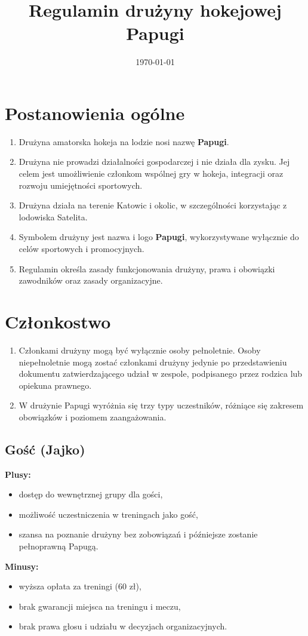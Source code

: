 \documentclass[12pt,a4paper]{article}
\title{Regulamin drużyny hokejowej Papugi}
\date{\today}
\let\stdsection\section
\renewcommand\section{\clearpage\stdsection}
\begin{document}
\maketitle
\tableofcontents

\section{Postanowienia ogólne}
\begin{enumerate}
  \item Drużyna amatorska hokeja na lodzie nosi nazwę \textbf{Papugi}.
  \item Drużyna nie prowadzi działalności gospodarczej i nie działa dla zysku. Jej celem jest umożliwienie członkom wspólnej gry w hokeja, integracji oraz rozwoju umiejętności sportowych.
  \item Drużyna działa na terenie Katowic i okolic, w szczególności korzystając z lodowiska Satelita.
  \item Symbolem drużyny jest nazwa i logo \textbf{Papugi}, wykorzystywane wyłącznie do celów sportowych i promocyjnych.
  \item Regulamin określa zasady funkcjonowania drużyny, prawa i obowiązki zawodników oraz zasady organizacyjne.
\end{enumerate}

\section{Członkostwo}
\begin{enumerate}
  \item Członkami drużyny mogą być wyłącznie osoby pełnoletnie. Osoby niepełnoletnie mogą zostać członkami drużyny jedynie po przedstawieniu dokumentu zatwierdzającego udział w zespole, podpisanego przez rodzica lub opiekuna prawnego.
  \item W drużynie Papugi wyróżnia się trzy typy uczestników, różniące się zakresem obowiązków i poziomem zaangażowania.
\end{enumerate}

\subsection{Gość (Jajko)}
\textbf{Plusy:}
\begin{itemize}
    \item dostęp do wewnętrznej grupy dla gości,
    \item możliwość uczestniczenia w treningach jako gość,
    \item szansa na poznanie drużyny bez zobowiązań i późniejsze zostanie pełnoprawną Papugą.
\end{itemize}
\textbf{Minusy:}
\begin{itemize}
    \item wyższa opłata za treningi (60 zł),
    \item brak gwarancji miejsca na treningu i meczu,
    \item brak prawa głosu i udziału w decyzjach organizacyjnych.
\end{itemize}
\end{document}
